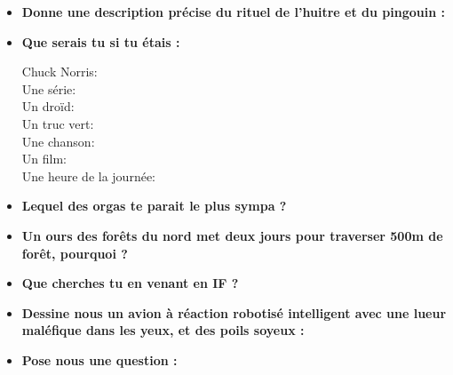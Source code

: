 \begin{itemize}
    \item \textbf{Donne une description précise du rituel  
	 de l'huitre et du pingouin :}
    \vspace{1cm}

    \item \textbf{Que serais tu si tu étais :}
    \begin{description}
	\item[Chuck Norris:]
	\item[Une série:]
	\item[Un droïd:]
	\item[Un truc vert:]
	\item[Une chanson:]
	\item[Un film:]
	\item[Une heure de la journée:]
    \end{description}
    \item \textbf{Lequel des orgas te parait le plus sympa ?}
    \vspace{1cm}
    \item \textbf{Un ours des forêts du nord met deux jours pour traverser 500m de forêt, pourquoi ?}
    \vspace{2cm}
    \item \textbf{Que cherches tu en venant en IF ?}
    \vspace{3cm}
    \item \textbf{Dessine nous un avion à réaction robotisé intelligent avec une
    lueur maléfique dans les yeux, et des poils soyeux :}
    \vspace{5cm}
    \item \textbf{Pose nous une question :}
    \vspace{2cm}
\end{itemize}
